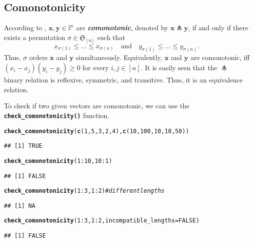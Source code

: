 \documentclass[11pt]{article}\usepackage[]{graphicx}\usepackage[]{color}
\makeatletter
\newcommand{\hlnum}[1]{\textcolor[rgb]{0.686,0.059,0.569}{#1}}%
\newcommand{\hlcom}[1]{\textcolor[rgb]{0.678,0.584,0.686}{\textit{#1}}}%
\newcommand{\hlopt}[1]{\textcolor[rgb]{0,0,0}{#1}}%
\newcommand{\hlstd}[1]{\textcolor[rgb]{0.345,0.345,0.345}{#1}}%
\newcommand{\hlkwc}[1]{\textcolor[rgb]{0.333,0.667,0.333}{#1}}%
\newcommand{\hlkwd}[1]{\textcolor[rgb]{0.737,0.353,0.396}{\textbf{#1}}}%
\newenvironment{kframe}{%
 \def\at@end@of@kframe{}%
 \ifinner\ifhmode%
  \def\at@end@of@kframe{\end{minipage}}%
  \begin{minipage}{\columnwidth}%
 \fi\fi%
 \def\FrameCommand##1{\hskip\@totalleftmargin \hskip-\fboxsep
 \colorbox{shadecolor}{##1}\hskip-\fboxsep
     \hskip-\linewidth \hskip-\@totalleftmargin \hskip\columnwidth}%
 \MakeFramed {\advance\hsize-\width
   \@totalleftmargin\z@ \linewidth\hsize
   \@setminipage}}%
 {\par\unskip\endMakeFramed%
 \at@end@of@kframe}
\newenvironment{knitrout}{}{} %
\renewcommand{\emph}[1]{\textbf{\textsl{#1}}}
\newcommand{\Rfunc}[1]{\texttt{\hlkwd{#1}}}
\newcommand{\vect}[1]{{\mathbf{#1}}}
\newcommand{\IvalPow}[1]{\mathbb{I}^{#1}}
\theoremstyle{remark}
\theoremstyle{definition}
\makeatother
\begin{document}



\subsection{Comonotonicity}\label{Sec:Comonotonicity}

According to \cite[Def.~2.123]{GrabischETAL2009:aggregationfunctions},
$\vect{x}, \vect{y}\in\IvalPow{n}$ are \emph{comonotonic},
denoted by $\vect{x} \pitchfork \vect{y}$,
if and only if there exists a permutation $\sigma\in\mathfrak{S}_{[n]}$
such that
\[
x_{\sigma(1)}\le \dots \le x_{\sigma(n)}
\quad\text{and}\quad
y_{\sigma(1)}\le \dots \le y_{\sigma(n)}.
\]
Thus, $\sigma$ orders $\vect{x}$ and $\vect{y}$ simultaneously.
Equivalently, $\vect{x}$ and $\vect{y}$ are comonotonic,
iff $(x_i-x_j)(y_i-y_j)\ge 0$ for every $i,j\in[n]$.
It is easily seen that the $\pitchfork$ binary relation
is reflexive, symmetric, and transitive. Thus, it is an equivalence relation.

To check if two given vectors are comonotonic, we can use the
\index{\Rfunc{check\_comonotonicity()}}\Rfunc{check\_comonotonicity()} function.

\begin{knitrout}\small
{}\color{fgcolor}\begin{kframe}
\begin{alltt}
\hlkwd{check_comonotonicity}\hlstd{(}\hlkwd{c}\hlstd{(}\hlnum{1}\hlstd{,} \hlnum{5}\hlstd{,} \hlnum{3}\hlstd{,} \hlnum{2}\hlstd{,} \hlnum{4}\hlstd{),} \hlkwd{c}\hlstd{(}\hlnum{10}\hlstd{,} \hlnum{100}\hlstd{,} \hlnum{10}\hlstd{,} \hlnum{10}\hlstd{,} \hlnum{50}\hlstd{))}
\end{alltt}
\begin{verbatim}
## [1] TRUE
\end{verbatim}
\begin{alltt}
\hlkwd{check_comonotonicity}\hlstd{(}\hlnum{1}\hlopt{:}\hlnum{10}\hlstd{,} \hlnum{10}\hlopt{:}\hlnum{1}\hlstd{)}
\end{alltt}
\begin{verbatim}
## [1] FALSE
\end{verbatim}
\begin{alltt}
\hlkwd{check_comonotonicity}\hlstd{(}\hlnum{1}\hlopt{:}\hlnum{3}\hlstd{,} \hlnum{1}\hlopt{:}\hlnum{2}\hlstd{)} \hlcom{# different lengths}
\end{alltt}
\begin{verbatim}
## [1] NA
\end{verbatim}
\begin{alltt}
\hlkwd{check_comonotonicity}\hlstd{(}\hlnum{1}\hlopt{:}\hlnum{3}\hlstd{,} \hlnum{1}\hlopt{:}\hlnum{2}\hlstd{,} \hlkwc{incompatible_lengths}\hlstd{=}\hlnum{FALSE}\hlstd{)}
\end{alltt}
\begin{verbatim}
## [1] FALSE
\end{verbatim}
\end{kframe}
\end{knitrout}
\end{document}
